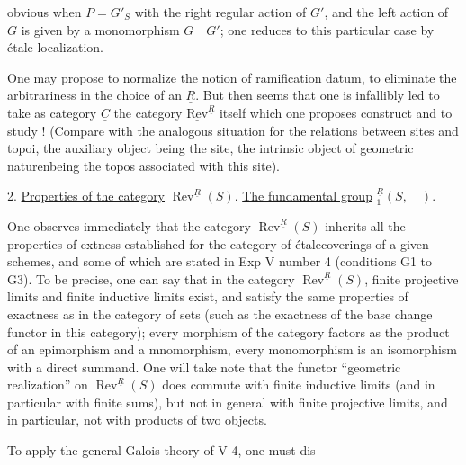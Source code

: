 obvious when $P=G'_S$ with the right regular action of $G'$, and the left action of $G$ is given by a monomorphism $G\quad G'$; one reduces to this particular case by étale localization.

One may propose to normalize the notion of ramification datum, to eliminate the arbitrariness in the choice of an $\underline{R}$. But then  seems that one is infallibly led to take as category $\underline{C}$ the category $\underline{\mathrm{Rev}}^{\underline{R}}$ itself which one proposes  construct and to study ! (Compare with the analogous situation for the relations between sites and topoi, the auxiliary object being the site, the intrinsic object of geometric naturenbeing the topos associated with this site).

2. \uline{Properties of the category} $\operatorname{Rev}^{\underline{R}}(S)$. \uline{The fundamental group} $ {}^{\underline{R}}_1(S,\quad)$.

One observes immediately that the category $\operatorname{Rev}^{\underline{R}}(S)$ inherits all the properties of extness  established for the category of étalecoverings of a given schemes, and some of which are stated in Exp V number 4 (conditions G1 to G3). To be precise, one can say that in the category $\operatorname{Rev}^{\underline{R}}(S)$, finite projective limits and finite inductive limits exist, and satisfy the same properties of exactness as in the category of sets (such as the exactness of the base change functor in this category);   every morphism of the category factors as the product of an epimorphism and a mnomorphism,  every monomorphism is an isomorphism with a direct summand. One will take note that the functor ``geometric realization'' on $\operatorname{Rev}^{\underline{R}}(S)$ does commute with finite inductive limits (and  in particular with finite sums), but not in general with finite projective limits, and in particular, not with products of two objects.

To apply the general Galois theory of V 4, one must dis-
